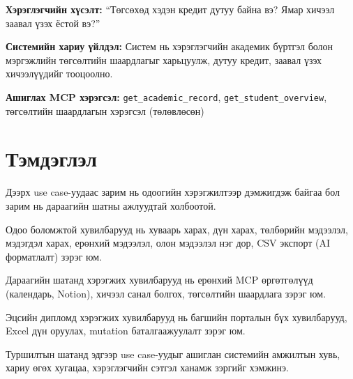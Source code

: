 \textbf{Хэрэглэгчийн хүсэлт:} ``Төгсөхөд хэдэн кредит дутуу байна вэ? Ямар хичээл заавал үзэх ёстой вэ?''

\textbf{Системийн хариу үйлдэл:} Систем нь хэрэглэгчийн академик бүртгэл болон мэргэжлийн төгсөлтийн шаардлагыг харьцуулж, дутуу кредит, заавал үзэх хичээлүүдийг тооцоолно.

\textbf{Ашиглах MCP хэрэгсэл:} \texttt{get\_academic\_record}, \texttt{get\_student\_overview}, төгсөлтийн шаардлагын хэрэгсэл (төлөвлөсөн)

\section{Тэмдэглэл}

Дээрх use case-уудаас зарим нь одоогийн хэрэгжилтээр дэмжигдэж байгаа бол зарим нь дараагийн шатны ажлуудтай холбоотой.

Одоо боломжтой хувилбарууд нь хуваарь харах, дүн харах, төлбөрийн мэдээлэл, мэдэгдэл харах, ерөнхий мэдээлэл, олон мэдээлэл нэг дор, CSV экспорт (AI форматлалт) зэрэг юм.

Дараагийн шатанд хэрэгжих хувилбарууд нь ерөнхий MCP өргөтгөлүүд (календарь, Notion), хичээл санал болгох, төгсөлтийн шаардлага зэрэг юм.

Эцсийн дипломд хэрэгжих хувилбарууд нь багшийн порталын бүх хувилбарууд, Excel дүн оруулах, mutation баталгаажуулалт зэрэг юм.

Туршилтын шатанд эдгээр use case-уудыг ашиглан системийн амжилтын хувь, хариу өгөх хугацаа, хэрэглэгчийн сэтгэл ханамж зэргийг хэмжинэ.
